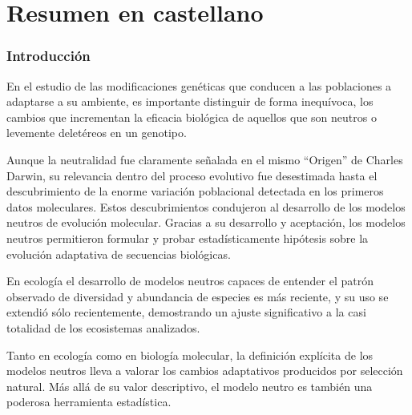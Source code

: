 

\part*{Resumen en castellano}


\section*{Introducción}

En el estudio de las modificaciones genéticas que conducen a las poblaciones a adaptarse a su ambiente, es importante distinguir de forma inequívoca, los cambios que incrementan la eficacia biológica de aquellos que son neutros o levemente deletéreos en un genotipo.

Aunque la neutralidad fue claramente señalada en el mismo ``Origen'' de Charles Darwin, su relevancia dentro del proceso evolutivo fue desestimada hasta el descubrimiento de la enorme variación poblacional detectada en los primeros datos moleculares. Estos descubrimientos condujeron al desarrollo de los modelos neutros de evolución molecular. Gracias a su desarrollo y aceptación, los modelos neutros permitieron formular y probar estadísticamente hipótesis sobre la evolución adaptativa de secuencias biológicas.

En ecología el desarrollo de modelos neutros capaces de entender el patrón observado de diversidad y abundancia de especies es más reciente, y su uso se extendió sólo recientemente, demostrando un ajuste significativo a la casi totalidad de los ecosistemas analizados.

Tanto en ecología como en biología molecular, la definición explícita de los modelos neutros lleva a valorar los cambios adaptativos producidos por selección natural. Más allá de su valor descriptivo, el modelo neutro es también una poderosa herramienta estadística.

